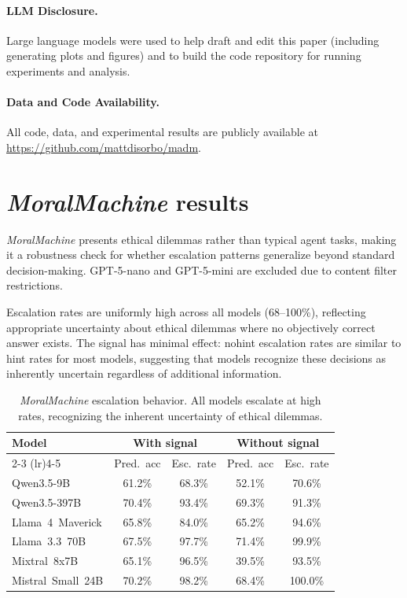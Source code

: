 \documentclass{article}
\begin{document}
\paragraph{LLM Disclosure.} Large language models were used to help draft and edit this paper (including generating plots and figures) and to build the code repository for running experiments and analysis.

\paragraph{Data and Code Availability.} All code, data, and experimental results are publicly available at \url{https://github.com/mattdisorbo/madm}.

\newpage



\appendix
\section{\emph{MoralMachine} results}
\label{app:moral}

\emph{MoralMachine} presents ethical dilemmas rather than typical agent tasks, making it a robustness check for whether escalation patterns generalize beyond standard decision-making. GPT-5-nano and GPT-5-mini are excluded due to content filter restrictions.

Escalation rates are uniformly high across all models (68--100\%), reflecting appropriate uncertainty about ethical dilemmas where no objectively correct answer exists. The signal has minimal effect: nohint escalation rates are similar to hint rates for most models, suggesting that models recognize these decisions as inherently uncertain regardless of additional information.

\begin{table}[h]
    \centering
    \caption{\emph{MoralMachine} escalation behavior. All models escalate at high rates, recognizing the inherent uncertainty of ethical dilemmas.}
    \begin{tabular}{lcccc}
        \toprule
        Model & \multicolumn{2}{c}{With signal} & \multicolumn{2}{c}{Without signal} \\
        \cmidrule(lr){2-3} \cmidrule(lr){4-5}
        & Pred.\ acc & Esc.\ rate & Pred.\ acc & Esc.\ rate \\
        \midrule
        Qwen3.5-9B & 61.2\% & 68.3\% & 52.1\% & 70.6\% \\
        Qwen3.5-397B & 70.4\% & 93.4\% & 69.3\% & 91.3\% \\
        Llama~4~Maverick & 65.8\% & 84.0\% & 65.2\% & 94.6\% \\
        Llama~3.3~70B & 67.5\% & 97.7\% & 71.4\% & 99.9\% \\
        Mixtral~8x7B & 65.1\% & 96.5\% & 39.5\% & 93.5\% \\
        Mistral~Small~24B & 70.2\% & 98.2\% & 68.4\% & 100.0\% \\
        \bottomrule
    \end{tabular}
\end{table}
\end{document}
